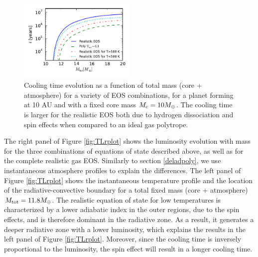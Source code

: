 \documentclass[apj]{emulateapj}
\begin{document}
\begin{figure}[h]
\centering
\includegraphics[width=0.5\textwidth]{../../figs/ModelAtmospheres/RadSelfGravRealEOS/EOSeffects/tplot.pdf}
\caption{Cooling time evolution as a function of total mass (core + atmosphere) for a variety of EOS combinations, for a planet forming at 10 AU and with a fixed core mass $M_{\rm c}=10 M_{\oplus}$. The cooling time is larger for the realistic EOS both due to hydrogen dissociation and spin effects when compared to an ideal gas polytrope.}
\label{fig:tplotall}
\end{figure}


The right panel of Figure \ref{fig:TLrplot} shows the luminosity evolution with mass for the three combinations of equations of state described above, as well as for the complete realistic gas EOS. Similarly to section \ref{deladpoly}, we use instantaneous atmosphere profiles to explain the differences. The left panel of Figure \ref{fig:TLrplot} shows the instantaneous temperature profile and the location of the radiative-convective boundary for a total fixed mass (core + atmosphere) $M_{\rm{tot}}=11.8 M_{\oplus}$. The realistic equation of state for low temperatures is characterized by a lower adiabatic index in the outer regions, due to the spin effects, and is therefore dominant in the radiative zone. As a result, it generates a deeper radiative zone with a lower luminosity, which explains the results in the left panel of Figure \ref{fig:TLrplot}. Moreover, since the cooling time is inversely proportional to the luminosity, the spin effect will result in a longer cooling time.
\end{document}
